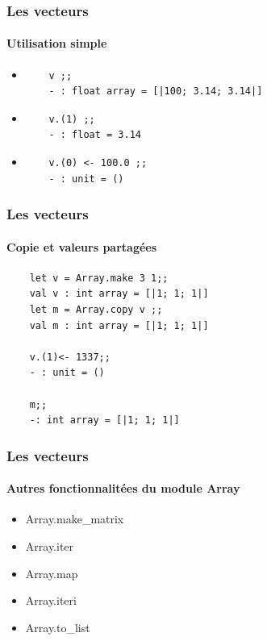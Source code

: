 \begin{frame}[fragile]
	\frametitle{Les vecteurs}
	\framesubtitle{Utilisation simple}
	\begin{itemize}
	\item
	\begin{lstlisting}
	v ;;
	- : float array = [|100; 3.14; 3.14|]
	\end{lstlisting}

	\item
	\begin{lstlisting}
	v.(1) ;;
	- : float = 3.14
	\end{lstlisting}

	\item
	\begin{lstlisting}
	v.(0) <- 100.0 ;;
	- : unit = ()
	\end{lstlisting}
	\end{itemize}
\end{frame}

\begin{frame}[fragile]
	\frametitle{Les vecteurs}
	\framesubtitle{Copie et valeurs partagées}
	\begin{lstlisting}
	let v = Array.make 3 1;;
	val v : int array = [|1; 1; 1|]
	let m = Array.copy v ;;
	val m : int array = [|1; 1; 1|]

	v.(1)<- 1337;;
	- : unit = ()

	m;;
	-: int array = [|1; 1; 1|]
	\end{lstlisting}
\end{frame}

\begin{frame}[fragile]
	\frametitle{Les vecteurs}
	\framesubtitle{Autres fonctionnalitées du module Array}
	\begin{itemize}
	\item Array.make\_matrix
	
	\item Array.iter

	\item Array.map

	\item Array.iteri

	\item Array.to\_list

	\end{itemize}
\end{frame}

